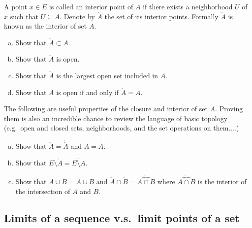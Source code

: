 \begin{asw}
  
\end{asw}


A point $x \in E$ is called an interior point of $A$ if there exists a neighborhood $U$ of $x$ such that $U \subseteq A$.
Denote by $\mathring A$ the set of its interior points.
Formally $\mathring A$ is known as the interior of set $A$.

\begin{qst}
  \begin{enumerate}[(a)]
    \item Show that $\mathring A \subset A$.
    \item Show that $\mathring A$ is open. 
    \item Show that $\mathring A$ is the largest open set included in $A$.
    \item Show that $A$ is open if and only if $\mathring A = A$.   
  \end{enumerate} 
\end{qst} 

\begin{asw}
  
\end{asw}

The following are useful properties of the closure and interior of set $A$. Proving them is also an incredible chance to review the language of basic topology (e.g.\ open and closed sets, neighborhoods, and the set operations on them....) 

\begin{qst}
  \begin{enumerate}[(a)]
    \item Show that $\mathring{A}=\mathring{\mathring{A}}$ and $\bar A = \bar{\bar{A}}$.
    \item Show that $E \setminus \mathring A = \overline{E \setminus A}.$
    \item Show that $\bar A \cup \bar B = \overline{A \cup B}$ and 
      $\mathring A \cap \mathring B = \mathring{\widehat{A \cap B}}$ where 
      $\mathring{\widehat{A \cap B}}$ is the interior of the intersection of $A$ and $B$. 
  \end{enumerate} 
\end{qst} 

\subsection{Limits of a  sequence v.s.\ limit points of a set}

